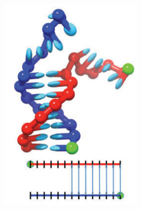 \begin{figure}[ht]
\begin{centering}
\begin{subfigure}[t]{\dimexpr.2\linewidth-1.3em\relax}
  \includegraphics[width=.98\linewidth,valign=t]{Figures/hybridDiag4.png}
  \end{subfigure}%
  \hspace{-0.38cm}
  \begin{subfigure}[t]{\dimexpr.2\linewidth-1.3em\relax}
  \centering

\end{subfigure}
\end{centering}
\end{figure}
